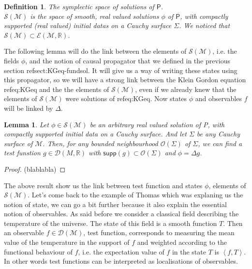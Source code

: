 \documentclass[10pt]{book}
\newcommand{\supp}{\mathsf{supp}}
\newcommand{\sm}[1]{\left\langle#1\right\rangle}
\newcommand{\Dcal}{\mathcal{D}}
\newcommand{\Mcal}{\mathcal{M}}
\newcommand{\Ocal}{\mathcal{O}}
\newcommand{\Scal}{\mathcal{S}}
\newcommand{\Rbb}{\mathbb{R}}
\newcommand{\Psf}{\mathsf{P}}
\theoremstyle{break}
\newtheorem{lemma}{Lemma}
\newtheorem{definition}{Definition}
\begin{document}
\begin{definition} \emph{The symplectic space of solutions of $\Psf$.} \\
$\mathcal{S}(\Mcal)$ is the space of smooth, real valued solutions $\phi$ of $\Psf$, with compactly supported (real valued) initial datas on a Cauchy surface $\Sigma$. We noticed that $\mathcal{S}(\Mcal) \subset \mathcal{E}\left(\Mcal,\mathbb{R}\right)$. 
\end{definition}

The following lemma will do the link between the elements of $\Scal(\Mcal)$, i.e. the fields $\phi$, and the notion of causal propagator that we defined in the previous section ref{sect:KGeq-fundsol}. It will give us a way of writing these states using this propagator, so we will have a strong link between the Klein Gordon equation ref{eq:KGeq} and the the elements of $\Scal(\Mcal)$, even if we already knew that the elements of $\Scal(\Mcal)$ were solutions of ref{eq:KGeq}. Now states $\phi$ and observables $f$ will be linked by $\Delta$.

\begin{lemma} 
 Let $\phi \in \Scal(\Mcal)$ be an arbitrary real valued solution of P, with compactly supported initial data on a Cauchy surface. And let $\Sigma$ be any Cauchy surface of $\Mcal$. Then, for any bounded neighbourhood $\Ocal(\Sigma)$ of $\Sigma$, we can find a test funstion $g\in \Dcal(M,\Rbb)$ with $\supp\left(g\right) \subset \Ocal(\Sigma)$ and $\phi = \Delta g$. 
\end{lemma}

\begin{proof}
(blablabla)
\end{proof}

The above result show us the link between test function and states $\phi$, elements of $\Scal(\Mcal)$. Let's come back to the example of Thomas %
which was explaning us the notion of state, we can go a bit further because it also explain the essential notion of observables. As said before we consider a classical field describing the temperature of the universe. The state of this field is a smooth function $T$. Then an observable $f \in \Dcal(\Mcal)$, test function, corresponds to measuring the mean value of the temperature in the support of $f$ and weighted according to the functional behaviour of $f$, i.e. the expectation value of $f$ in the state $T$ is $\sm{f,T}$. In other words test functions can be interpreted as localisations of observables.
\end{document}
